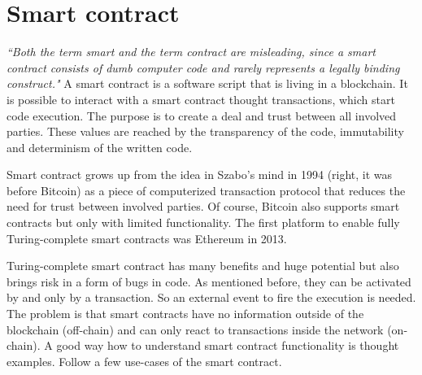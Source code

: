 \documentclass[thesis=M,english]{FITthesis}[2019/12/23]
\begin{document}
\section{Smart contract} \label{smartContract}

\textit{``Both the term smart and the term contract are misleading, since a smart contract consists of dumb computer code and rarely represents a legally binding construct."} 
\cite{smartContractBibReview}
 A smart contract is a software script that is living in a blockchain. It is possible to interact with a smart contract thought transactions, which start code execution. The purpose is to create a deal and trust between all involved parties. These values are reached by the transparency of the code, immutability and determinism of the written code. 
 
Smart contract grows up from the idea in Szabo's mind in 1994 \cite{szabo1994} (right, it was before Bitcoin) as a piece of computerized transaction protocol that reduces the need for trust between involved parties. Of course, Bitcoin also supports smart contracts \cite{bitcoinContracts} but only with limited functionality. The first platform to enable fully Turing-complete smart contracts was Ethereum in 2013.

Turing-complete smart contract has many benefits and huge potential but also brings risk in a form of bugs in code. As mentioned before, they can be activated by and only by a transaction. So an external event to fire the execution is needed. The problem is that smart contracts have no information outside of the blockchain (off-chain) and can only react to transactions inside the network (on-chain).
A good way how to understand smart contract functionality is thought examples. Follow a few use-cases of the smart contract.
\end{document}
